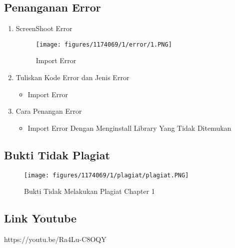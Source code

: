 \subsection{Penanganan Error}
\begin{enumerate}
	\item ScreenShoot Error
	\begin{figure}[H]
		\texttt{[image: figures/1174069/1/error/1.PNG]}
		\centering
		\caption{Import Error}
	\end{figure}

	\item Tuliskan Kode Error dan Jenis Error
	\begin{itemize}
		\item Import Error
	\end{itemize}
	\item Cara Penangan Error
	\begin{itemize}
		\item Import Error
		\hfill\break
		Dengan Menginstall Library Yang Tidak Ditemukan
	\end{itemize}
\end{enumerate}

\subsection{Bukti Tidak Plagiat}
\begin{figure}[H]
	\texttt{[image: figures/1174069/1/plagiat/plagiat.PNG]}
	\centering
	\caption{Bukti Tidak Melakukan Plagiat Chapter 1}
\end{figure}

\subsection{Link Youtube}
https://youtu.be/Ra4Lu-C8OQY
